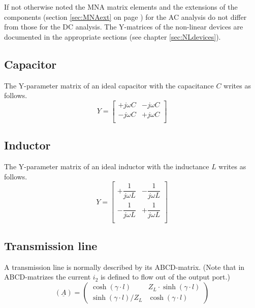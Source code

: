 \documentclass[10pt]{report}
\begin{document}
If not otherwise noted the MNA matrix elements and the extensions of
the components (section \ref{sec:MNAext} on page \pageref{sec:MNAext})
for the AC analysis do not differ from those for the DC analysis.  The
Y-matrices of the non-linear devices are documented in the appropriate
sections (see chapter \ref{sec:NLdevices}).

\subsection{Capacitor}

The Y-parameter matrix of an ideal capacitor with the capacitance $C$
writes as follows.
\begin{equation}
Y =
\begin{bmatrix}
+j\omega C & -j\omega C\\
-j\omega C & +j\omega C\\
\end{bmatrix}
\end{equation}

\subsection{Inductor}

The Y-parameter matrix of an ideal inductor with the inductance $L$
writes as follows.
\begin{equation}
Y =
\begin{bmatrix}
+\dfrac{1}{j\omega L} & -\dfrac{1}{j\omega L}\\
-\dfrac{1}{j\omega L} & +\dfrac{1}{j\omega L}\\
\end{bmatrix}
\end{equation}


\subsection{Transmission line}

A transmission line is normally described by its ABCD-matrix.
(Note that in ABCD-matrizes the current $i_2$ is defined to
flow out of the output port.)
\begin{equation}
(\underline{A}) =
\begin{pmatrix}
\cosh(\gamma\cdot l)       & Z_L\cdot \sinh(\gamma\cdot l)\\
\sinh(\gamma\cdot l) / Z_L & \cosh(\gamma\cdot l)
\end{pmatrix}
\end{equation}
\end{document}
